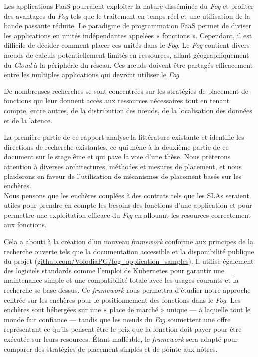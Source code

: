 Les applications \gls{FaaS} pourraient exploiter la nature disséminée du \emph{Fog} et profiter des avantages du \emph{Fog} tels que le traitement en temps réel et une utilisation de la bande passante réduite. Le paradigme de programmation \gls{FaaS} permet de diviser les applications en unités indépendantes appelées « fonctions ». Cependant, il est difficile de décider comment placer ces unités dans le \emph{Fog}. Le \emph{Fog} contient divers nœuds de calculs potentiellement limités en ressources, allant géographiquement du \emph{Cloud} à la périphérie du réseau. Ces nœuds doivent être partagés efficacement entre les multiples applications qui devront utiliser le \emph{Fog}.

De nombreuses recherches se sont concentrées sur les stratégies de placement de fonctions qui leur donnent accès aux ressources nécessaires tout en tenant compte, entre autres, de la distribution des nœuds, de la localisation des données et de la latence.

La première partie de ce rapport analyse la littérature existante et identifie les directions de recherche existantes, ce qui mène à la deuxième partie de ce document sur le stage ême et qui pave la voie d'une thèse. Nous prêterons attention à diverses architectures, méthodes et mesures de placement, et nous plaiderons en faveur de l'utilisation de mécanismes de placement basés sur les enchères.\\
Nous pensons que les enchères couplées à des contrats tels que les \glspl{SLA} seraient utiles pour prendre en compte les besoins des fonctions d'une application et pour permettre une exploitation efficace du \emph{Fog} en allouant les resources correctement aux fonctions.

Cela a abouti à la création d'un nouveau \emph{framework} conforme aux principes de la recherche ouverte tels que la documentation accessible et la disponibilité publique du projet (\href{https://github.com/VolodiaPG/fog_application_samples}{github.com/VolodiaPG/fog\_application\_samples}). Il utilise également des logiciels standards comme l'emploi de Kubernetes pour garantir une maintenance simple et une compatibilité totale avec les usages courants et la recherche se base dessus. Ce \emph{framework} nous permettra d'étudier notre approche centrée sur les enchères pour le positionnement des fonctions dans le \emph{Fog}. Les enchères sont hébergées sur une « place de marché » unique — à laquelle tout le monde fait confiance — tandis que les nœuds du \emph{Fog} soumettent une offre représentant ce qu'ils pensent être le prix que la fonction doit payer pour être exécutée sur leurs resources. Étant malléable, le \emph{framework} sera adapté pour comparer des stratégies de placement simples et de pointe aux nôtres.



